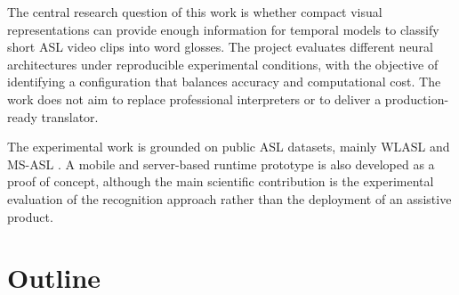 The central research question of this work is whether compact visual representations can provide
enough information for temporal models to classify short ASL video clips into word glosses. The
project evaluates different neural architectures under reproducible experimental conditions, with
the objective of identifying a configuration that balances accuracy and computational cost. The
work does not aim to replace professional interpreters or to deliver a production-ready translator.

The experimental work is grounded on public ASL datasets, mainly WLASL \cite{li2020wlasl} and
MS-ASL \cite{joze2019msasl}. A mobile and server-based runtime prototype is also developed as a
proof of concept, although the main scientific contribution is the experimental evaluation of the
recognition approach rather than the deployment of an assistive product.

\section{Outline}

